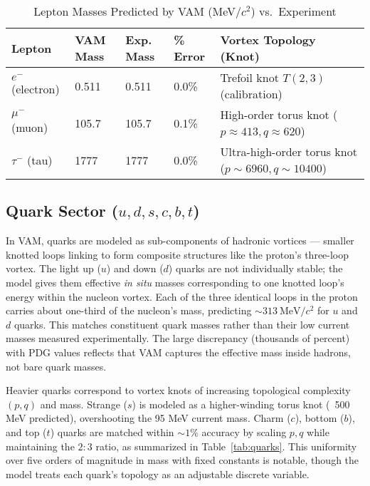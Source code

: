 \begin{table}[h!]
    \centering
    \begin{tabular}{lllll}
        \toprule
        \textbf{Lepton} & \textbf{VAM Mass} & \textbf{Exp. Mass} & \textbf{\% Error} & \textbf{Vortex Topology (Knot)} \\
        \midrule
        $e^-$ (electron) & 0.511 & 0.511 & 0.0\% & Trefoil knot $T(2,3)$ (calibration) \\
        $\mu^-$ (muon) & 105.7 & 105.7 & 0.1\% & High-order torus knot ($p \approx 413, q \approx 620$) \\
        $\tau^-$ (tau) & 1777 & 1777 & 0.0\% & Ultra-high-order torus knot ($p \sim 6960, q \sim 10400$) \\
        \bottomrule
    \end{tabular}
    \caption{Lepton Masses Predicted by VAM (MeV/$c^2$) vs.\ Experiment}
    \label{tab:leptons}
\end{table}

\subsection{Quark Sector ($u, d, s, c, b, t$)}

In VAM, quarks are modeled as sub-components of hadronic vortices — smaller knotted loops linking to form composite structures like the proton’s three-loop vortex. The light up ($u$) and down ($d$) quarks are not individually stable; the model gives them effective \textit{in situ} masses corresponding to one knotted loop’s energy within the nucleon vortex. Each of the three identical loops in the proton carries about one-third of the nucleon’s mass, predicting $\sim 313~\mathrm{MeV}/c^2$ for $u$ and $d$ quarks. This matches constituent quark masses rather than their low current masses measured experimentally. The large discrepancy (thousands of percent) with PDG values reflects that VAM captures the effective mass inside hadrons, not bare quark masses.

Heavier quarks correspond to vortex knots of increasing topological complexity $(p,q)$ and mass. Strange ($s$) is modeled as a higher-winding torus knot (~500 MeV predicted), overshooting the 95 MeV current mass. Charm ($c$), bottom ($b$), and top ($t$) quarks are matched within $\sim 1\%$ accuracy by scaling $p,q$ while maintaining the $2:3$ ratio, as summarized in Table~\ref{tab:quarks}. This uniformity over five orders of magnitude in mass with fixed constants is notable, though the model treats each quark’s topology as an adjustable discrete variable.

